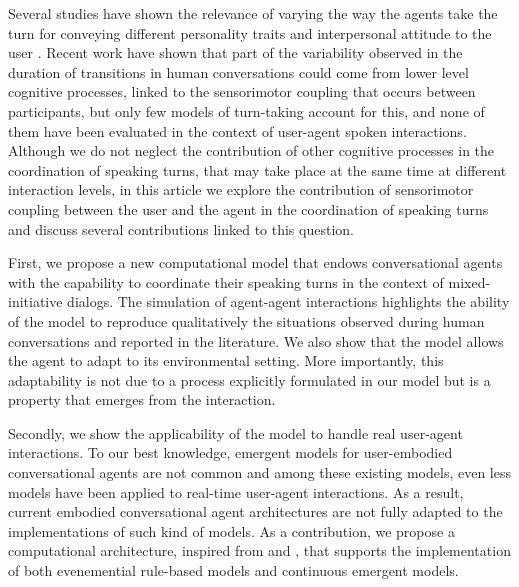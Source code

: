 Several studies have shown the relevance of varying the way the agents take the turn for conveying different personality traits and interpersonal attitude to the user \citep{ter_maat_how_2010,cafaro_effects_2016}. 
Recent work have shown that part of the variability observed in the duration of transitions in human conversations could come from lower level cognitive processes, linked to the sensorimotor coupling that occurs between participants, but only few models of turn-taking account for this, and none of them have been evaluated in the context of user-agent spoken interactions. 
Although we do not neglect the contribution of other cognitive processes in the coordination of speaking turns, that may take place at the same time at different interaction levels, 
in this article we explore the contribution of sensorimotor coupling between the user and the agent in the coordination of speaking turns and discuss several contributions linked to this question. 

First, we propose a new computational model that endows conversational agents with the capability to coordinate their speaking turns in the context of mixed-initiative dialogs. The simulation of agent-agent interactions highlights the ability of the model to reproduce qualitatively the situations observed during human conversations and reported in the literature. 
We also show that the model allows the agent to adapt to its environmental setting.
More importantly, this adaptability is not due to a process explicitly formulated in our model but is a property that emerges from the interaction. 

Secondly, we show the applicability of the model to handle real user-agent interactions. To our best knowledge, emergent models for user-embodied conversational agents are not common and among these existing models, even less models have been applied to real-time user-agent interactions. As a result, current embodied conversational agent architectures are not fully adapted to the implementations of such kind of models. 
As a contribution, we propose a computational architecture, inspired from \cite{kopp_architecture_2014} and \cite{thorisson_mind_1999}, that supports the implementation of both evenemential rule-based models and continuous emergent models. 


